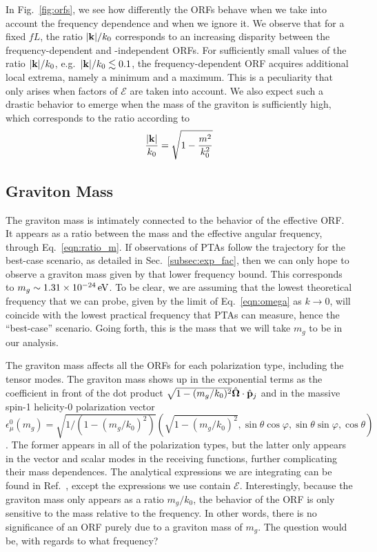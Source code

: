 \documentclass[prd,aps,psfig,nofootinbib,nobibnotes,superscriptaddress,preprintnumbers,times]{revtex4-2}\setlength{\topmargin}{-14mm}
\newcommand{\eV}{\,{\rm eV}}
\begin{document}
In Fig.\ \ref{fig:orfs}, we see how differently the ORFs behave when we take into account the frequency dependence and when we ignore it. We observe that for a fixed $fL$, the ratio $|{\bf k}|/k_0$ corresponds to an increasing disparity between the frequency-dependent and -independent ORFs. For sufficiently small values of the ratio $|{\bf k}|/k_0$, e.g.\ $|{\bf k}|/k_0 \lesssim 0.1$, the frequency-dependent ORF acquires additional local extrema, namely a minimum and a maximum. This is a peculiarity that only arises when factors of $\mathcal{E}$ are taken into account. We also expect such a drastic behavior to emerge when the mass of the graviton is sufficiently high, which corresponds to the ratio according to 
\begin{equation}\label{eqn:ratio_m}
    \frac{|{\bf k}|}{k_0} = \sqrt{1 - \frac{m^2}{k_0^2}}
\end{equation}

\subsection{Graviton Mass}\label{subsec:mass}
The graviton mass is intimately connected to the behavior of the effective ORF. It appears as a ratio between the mass and the effective angular frequency, through Eq.\ \ref{eqn:ratio_m}. If observations of PTAs follow the trajectory for the best-case scenario, as detailed in Sec.\ \ref{subsec:exp_fac}, then we can only hope to observe a graviton mass given by that lower frequency bound. This corresponds to $m_g \sim 1.31\times 10^{-24} \eV$. To be clear, we are assuming that the lowest theoretical frequency that we can probe, given by the limit of Eq.\ \ref{eqn:omega} as $k\rightarrow 0$, will coincide with the lowest practical frequency that PTAs can measure, hence the ``best-case'' scenario. Going forth, this is the mass that we will take $m_g$ to be in our analysis.

The graviton mass affects all the ORFs for each polarization type, including the tensor modes. The graviton mass shows up in the exponential terms as the coefficient in front of the dot product $\sqrt{1 - (m_g/k_0)^2}\hat{\bf \Omega}\cdot \hat{\bf p}_j$ and in the massive spin-1 helicity-0 polarization vector $\epsilon_\mu^0(m_g) = \sqrt{1 / (1 - (m_g/k_0)^2)}(\sqrt{1 - (m_g/k_0)^2}, \sin\theta\cos\varphi, \sin\theta\sin\varphi, \cos\theta)$. The former appears in all of the polarization types, but the latter only appears in the vector and scalar modes in the receiving functions, further complicating their mass dependences. The analytical expressions we are integrating can be found in Ref.\ \cite{Liang:2021bct}, except the expressions we use contain $\mathcal{E}$. Interestingly, because the graviton mass only appears as a ratio $m_g / k_0$, the behavior of the ORF is only sensitive to the mass relative to the frequency. In other words, there is no significance of an ORF purely due to a graviton mass of $m_g$. The question would be, with regards to what frequency?
\end{document}

